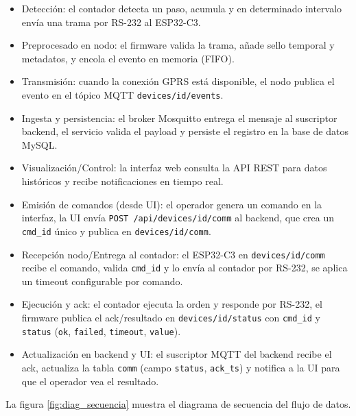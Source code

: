 \begin{itemize}

  \item Detección: el contador detecta un paso, acumula y en determinado intervalo envía una trama por RS-232 al ESP32-C3.

  \item Preprocesado en nodo: el firmware valida la trama, añade sello temporal y metadatos, y encola el evento en memoria (FIFO).

  \item Transmisión: cuando la conexión GPRS está disponible, el nodo publica el evento en el tópico MQTT \texttt{devices/{id}/events}.
  
  \item Ingesta y persistencia: el broker Mosquitto entrega el mensaje al suscriptor backend, el servicio valida el payload y persiste el registro en la base de datos MySQL.
  
  \item Visualización/Control: la interfaz web consulta la API REST para datos históricos y recibe notificaciones en tiempo real.
  
  \item Emisión de comandos (desde UI): el operador genera un comando en la interfaz, la UI envía
  \texttt{POST /api/devices/{id}/comm} al backend, que crea un \texttt{cmd\_id} único y publica en \texttt{devices/{id}/comm}.
  
  \item Recepción nodo/Entrega al contador: el ESP32-C3 en \texttt{devices/{id}/comm} recibe el comando, valida \texttt{cmd\_id} y lo envía al contador por RS-232, se aplica un timeout configurable por comando.
  
  \item Ejecución y ack: el contador ejecuta la orden y responde por RS-232, el firmware publica el ack/resultado en \texttt{devices/{id}/status} con \texttt{cmd\_id} y \texttt{status} (\texttt{ok}, \texttt{failed}, \texttt{timeout}, \texttt{value}).

  \item Actualización en backend y UI: el suscriptor MQTT del backend recibe el ack, actualiza la tabla \texttt{comm} (campo \texttt{status}, \texttt{ack\_ts}) y notifica a la UI para que el operador vea el resultado.
\end{itemize}


La figura \ref{fig:diag_secuencia} muestra el diagrama de secuencia del flujo de datos.


